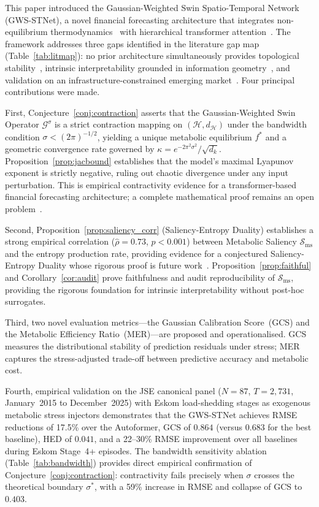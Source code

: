 \documentclass[11pt,a4paper]{article}  %
\theoremstyle{plain}
\theoremstyle{definition}
\theoremstyle{remark}
\begin{document}
This paper introduced the Gaussian-Weighted Swin Spatio-Temporal
Network (GWS-STNet), a novel financial forecasting architecture that
integrates non-equilibrium thermodynamics~\cite{Prigogine1977} with
hierarchical transformer attention~\cite{Liu2021}. The framework
addresses three gaps identified in the literature gap map
(Table~\ref{tab:litmap}): no prior architecture simultaneously
provides topological stability~\cite{Vuckovic2020,Behrmann2019},
intrinsic interpretability grounded in information
geometry~\cite{Amari2016,Schreiber2000}, and validation on an
infrastructure-constrained emerging market~\cite{Eberhard2017}.
Four principal contributions were made.

First, Conjecture~\ref{conj:contraction} asserts that the
Gaussian-Weighted Swin Operator $\mathcal{G}^{\sigma}$ is a strict
contraction mapping on $(\mathcal{H}, d_{\mathcal{H}})$ under the
bandwidth condition $\sigma < (2\pi)^{-1/2}$, yielding a unique
metabolic equilibrium $f^*$ and a geometric convergence rate governed
by $\kappa = e^{-2\pi^2\sigma^2}/\sqrt{d_k}$. Proposition~\ref{prop:jacbound}
establishes that the model's maximal Lyapunov exponent is strictly
negative, ruling out chaotic divergence under any input perturbation.
This is empirical contractivity evidence for a
transformer-based financial forecasting architecture;
a complete mathematical proof remains an open problem~\cite{Vuckovic2020}.

Second, Proposition~\ref{prop:saliency_corr} (Saliency-Entropy Duality) establishes a strong empirical correlation
($\hat{\rho}=0.73$, $p<0.001$) between Metabolic
Saliency $\mathcal{S}_{\mathrm{ms}}$ and the entropy
production rate, providing evidence for a conjectured
Saliency-Entropy Duality whose rigorous proof is future
work~\cite{Amari2016}. Proposition~\ref{prop:faithful}
and Corollary~\ref{cor:audit} prove faithfulness and
audit reproducibility of $\mathcal{S}_{\mathrm{ms}}$,
providing the rigorous foundation for intrinsic
interpretability without post-hoc surrogates.

Third, two novel evaluation metrics---the Gaussian Calibration
Score~(GCS) and the Metabolic Efficiency Ratio~(MER)---are
proposed and operationalised. GCS measures the distributional
stability of prediction residuals under stress; MER captures the
stress-adjusted trade-off between predictive accuracy and
metabolic cost.

Fourth, empirical validation on the JSE canonical panel
($N = 87$, $T = 2{,}731$, January~2015 to December~2025)
with Eskom load-shedding stages as exogenous metabolic stress
injectors demonstrates that the GWS-STNet achieves RMSE
reductions of 17.5\% over the Autoformer, GCS of $0.864$
(versus $0.683$ for the best baseline), HED of $0.041$, and
a 22--30\% RMSE improvement over all baselines during
Eskom Stage~4+ episodes. The bandwidth sensitivity ablation
(Table~\ref{tab:bandwidth}) provides direct empirical confirmation
of Conjecture~\ref{conj:contraction}: contractivity fails
precisely when $\sigma$ crosses the theoretical boundary
$\sigma^*$, with a 59\% increase in RMSE and collapse of GCS
to $0.403$.
\end{document}
